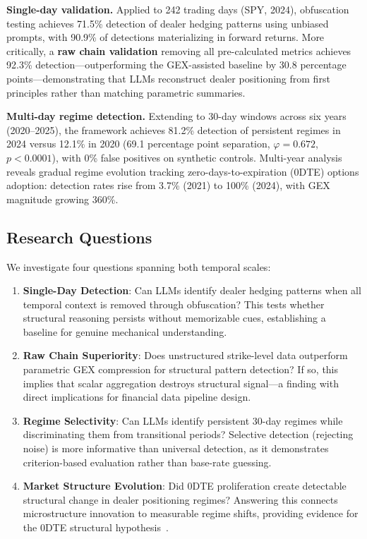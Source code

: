 \textbf{Single-day validation.} Applied to 242 trading days (SPY, 2024), obfuscation testing achieves 71.5\% detection of dealer hedging patterns using unbiased prompts, with 90.9\% of detections materializing in forward returns. More critically, a \textbf{raw chain validation} removing all pre-calculated metrics achieves 92.3\% detection---outperforming the GEX-assisted baseline by 30.8 percentage points---demonstrating that LLMs reconstruct dealer positioning from first principles rather than matching parametric summaries.

\textbf{Multi-day regime detection.} Extending to 30-day windows across six years (2020--2025), the framework achieves 81.2\% detection of persistent regimes in 2024 versus 12.1\% in 2020 (69.1 percentage point separation, $\varphi = 0.672$, $p < 0.0001$), with 0\% false positives on synthetic controls. Multi-year analysis reveals gradual regime evolution tracking zero-days-to-expiration (0DTE) options adoption: detection rates rise from 3.7\% (2021) to 100\% (2024), with GEX magnitude growing 360\%.

\subsection{Research Questions}

We investigate four questions spanning both temporal scales:

\begin{enumerate}
\item \textbf{Single-Day Detection}: Can LLMs identify dealer hedging patterns when all temporal context is removed through obfuscation? This tests whether structural reasoning persists without memorizable cues, establishing a baseline for genuine mechanical understanding.

\item \textbf{Raw Chain Superiority}: Does unstructured strike-level data outperform parametric GEX compression for structural pattern detection? If so, this implies that scalar aggregation destroys structural signal---a finding with direct implications for financial data pipeline design.

\item \textbf{Regime Selectivity}: Can LLMs identify persistent 30-day regimes while discriminating them from transitional periods? Selective detection (rejecting noise) is more informative than universal detection, as it demonstrates criterion-based evaluation rather than base-rate guessing.

\item \textbf{Market Structure Evolution}: Did 0DTE proliferation create detectable structural change in dealer positioning regimes? Answering this connects microstructure innovation to measurable regime shifts, providing evidence for the 0DTE structural hypothesis~\cite{dim2025zero,brogaard2023does}.
\end{enumerate}

